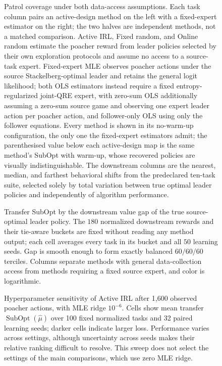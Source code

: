 \begin{figure}[t]
  \centering
  \caption{Patrol coverage under both data-access assumptions. Each task column
  pairs an active-design method on the left with a fixed-expert estimator on the
  right; the two halves are independent methods, not a matched comparison.
  Active IRL, Fixed random, and Online random estimate the poacher reward from
  leader policies selected by their own exploration protocols and assume no
  access to a source-task expert. Fixed-expert MLE observes poacher actions
  under the source Stackelberg-optimal leader and retains the general logit
  likelihood; both OLS estimators instead require a fixed
  entropy-regularized joint-QRE expert, with zero-sum OLS additionally assuming
  a zero-sum source game and observing one expert leader action per poacher
  action, and follower-only OLS using only the follower equations. Every method
  is shown in its no-warm-up configuration, the only one the fixed-expert
  estimators admit; the parenthesised value below each active-design map is the
  same method's SubOpt with warm-up, whose recovered policies are visually
  indistinguishable. The downstream columns are the nearest, median, and
  farthest behavioral shifts from the predeclared ten-task suite, selected
  solely by total variation between true optimal leader policies and
  independently of algorithm performance.}
  \label{fig:appendix-lobeke-transfer}
\end{figure}

\begin{figure}[p]
  \centering
  \resizebox{\textwidth}{!}{%
  }
  \caption{Transfer SubOpt by the downstream value gap of the true
  source-optimal leader policy. The $180$ normalized downstream rewards and
  their tie-aware buckets are fixed without reading any method output; each
  cell averages every task in its bucket and all $50$ learning seeds. Gap is
  smooth enough to form exactly balanced $60/60/60$ terciles. Columns separate
  methods with general data-collection access from methods requiring a fixed
  source expert, and color is logarithmic.}
  \label{fig:appendix-lobeke-behavioral-transfer-gap}
\end{figure}

\begin{figure}[t]
  \centering
  \resizebox{\textwidth}{!}{%
  }
  \caption{Hyperparameter sensitivity of Active IRL after 1,600 observed
  poacher actions, with MLE ridge $10^{-6}$. Cells show mean transfer
  $\operatorname{SubOpt}(\hat\mu)$ over 100 fixed normalized tasks and 32 paired
  learning seeds; darker cells indicate larger loss. Performance varies across
  settings, although uncertainty across seeds makes their relative ranking
  difficult to resolve. This sweep does not select the settings of the main
  comparisons, which use zero MLE ridge.}
  \label{fig:appendix-lobeke-hyperparameters}
\end{figure}

